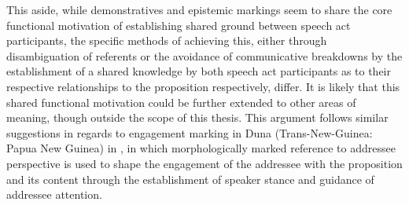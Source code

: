 This aside, while demonstratives and epistemic markings seem to share the core functional motivation of establishing shared ground between speech act participants, the specific methods of achieving this, either through disambiguation of referents or the avoidance of communicative breakdowns by the establishment of a shared knowledge by both speech act participants as to their respective relationships to the proposition respectively, differ. It is likely that this shared functional motivation could be further extended to other areas of meaning, though outside the scope of this thesis. This argument follows similar suggestions in regards to engagement marking in Duna (Trans-New-Guinea: Papua New Guinea) in , in which morphologically marked reference to addressee perspective is used to shape the engagement of the addressee with the proposition and its content through the establishment of speaker stance and guidance of addressee attention.


